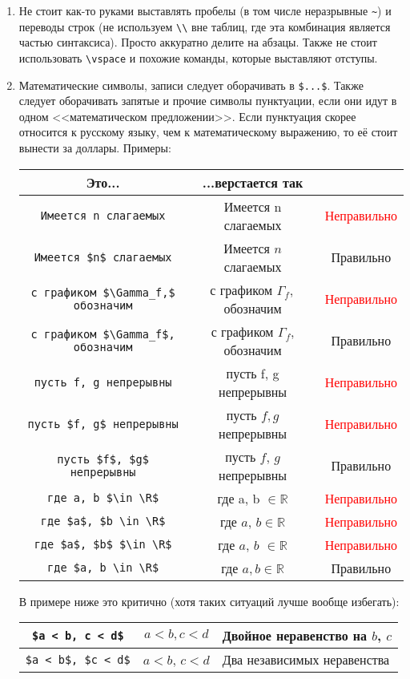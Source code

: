 \documentclass[12pt,a4paper]{book}
\def\R{\mathbb{R}}
\newcommand{\ok}{& \textcolor{green!60!black}{Правильно}}
\newcommand{\bad}{& \textcolor{red}{Неправильно}}
\begin{document}
\begin{enumerate}
\item
	Не стоит как-то руками выставлять пробелы (в том числе неразрывные \verb'~') и
	переводы строк (не используем \verb'\\' вне таблиц, где эта комбинация является частью синтаксиса).
	Просто аккуратно делите на абзацы.
	Также не стоит использовать \verb`\vspace` и похожие команды, которые выставляют отступы.
	
\item
	Математические символы, записи следует оборачивать в \verb'$...$'.
	Также следует оборачивать запятые и прочие символы пунктуации, если они
	идут в одном <<математическом предложении>>.
	Если пунктуация скорее относится к русскому языку, чем к математическому выражению, то её стоит вынести за доллары.
	Примеры:
	\begin{center}\begin{tabular}{|c|c|c|}
		\hline Это... & ...верстается так & \\
		\hline \verb!Имеется n слагаемых! & Имеется n слагаемых \bad \\
		\hline \verb!Имеется $n$ слагаемых! & Имеется $n$ слагаемых \ok \\
		\hline \verb!с графиком $\Gamma_f,$ обозначим! & с графиком $\Gamma_f,$ обозначим \bad \\
		\hline \verb!с графиком $\Gamma_f$, обозначим! & с графиком $\Gamma_f$, обозначим \ok \\
		\hline \verb!пусть f, g непрерывны! & пусть f, g непрерывны \bad \\
		\hline \verb!пусть $f, g$ непрерывны! & пусть $f, g$ непрерывны \bad \\
		\hline \verb!пусть $f$, $g$ непрерывны! & пусть $f$, $g$ непрерывны \ok \\
		\hline \verb!где a, b $\in \R$! & где a, b $\in \R$ \bad \\
		\hline \verb!где $a$, $b \in \R$! & где $a$, $b \in \R$ \bad \\
		\hline \verb!где $a$, $b$ $\in \R$! & где $a$, $b$ $\in \R$ \bad \\
		\hline \verb!где $a, b \in \R$! & где $a, b \in \R$ \ok \\
		\hline 
	\end{tabular}\end{center}

	В примере ниже это критично (хотя таких ситуаций лучше вообще избегать):
	\begin{center}\begin{tabular}{|c|c|l|}
		\hline \verb!$a < b, c < d$! & $a < b, c < d$ & Двойное неравенство на $b$, $c$ \\
		\hline \verb!$a < b$, $c < d$! & $a < b$, $c < d$ & Два независимых неравенства \\
	\hline
	\end{tabular}\end{center}


\end{enumerate}
\end{document}
